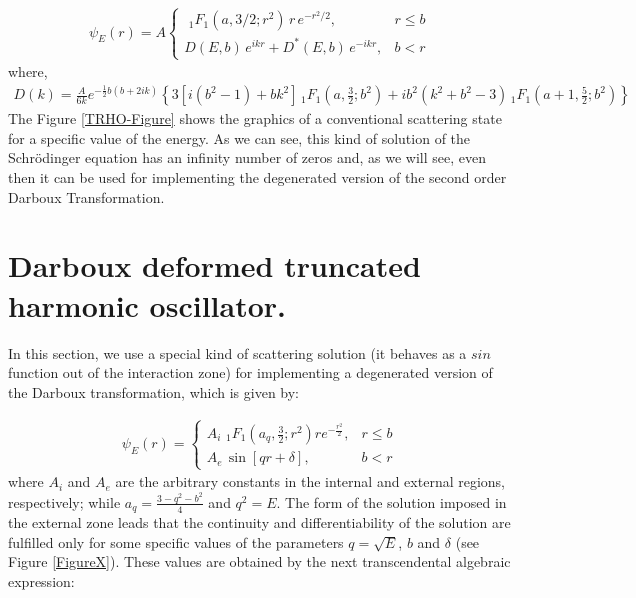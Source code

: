 \documentclass[a4paper]{jpconf}
\begin{document}
\begin{eqnarray}
\psi_E(r)=A\left\{
\begin{array}{cc}
 \,\, _1F_1(a,3/2;r^2)\, r\, e^{-r^2/2}, & r\leq b  \\[0.2cm]
D(E,b)\, e^{ikr}+ D^{*}(E,b)\, e^{-ikr},&b<r   \label{TRHO-PsiS}
\end{array}
\right.
\end{eqnarray}
where,
\begin{eqnarray*}
D(k)=\frac{A}{6k}e^{-\frac{1}{2}b(b+2ik)}\left\{ 3[i(b^{2}-1)+bk^{2}]\, _1F_1\left(a,\frac{3}{2};b^{2}\right)+ib^{2}(k^{2}+b^{2}-3)\, _1F_1\left(a+1,\frac{5}{2};b^{2}\right)\right\} 
\end{eqnarray*}
The Figure \ref{TRHO-Figure} shows the graphics of a conventional scattering state for a specific value of the energy. As we can see, this kind of solution of the Schr\" odinger equation has an infinity number of zeros and, as we will see, even then it can be used for implementing the degenerated version of the second order Darboux Transformation.

\section{Darboux deformed truncated harmonic oscillator.}

In this section, we use a special kind of scattering solution (it behaves as a $sin$ function out of the interaction zone) for implementing a degenerated version of the Darboux transformation, which is given by:

\begin{eqnarray}
\psi_E(r)=\left\{
\begin{array}{cc}
 A_i \,\, _1F_1\left(a_{q},\frac{3}{2};r^{2}\right)re^{-\frac{r^{2}}{2}} , & r\leq b  \\[0.2cm]
A_e\,\sin{[qr+\delta]},&b<r   \label{DDT-TF}
\end{array}
\right.
\end{eqnarray}
where  $A_i$ and $A_e$ are the arbitrary constants in the internal and external regions, respectively; while $a_{q}=\frac{3-q^{2}-b^{2}}{4}$ and $q^{2}=E$. The form of the solution imposed in the external zone leads that the continuity and differentiability of the solution are fulfilled only for some specific values of the parameters  $q=\sqrt{E}$,  $b$ and $\delta$ (see Figure \ref{FigureX}). These values are obtained by the next transcendental algebraic expression:
\end{document}
